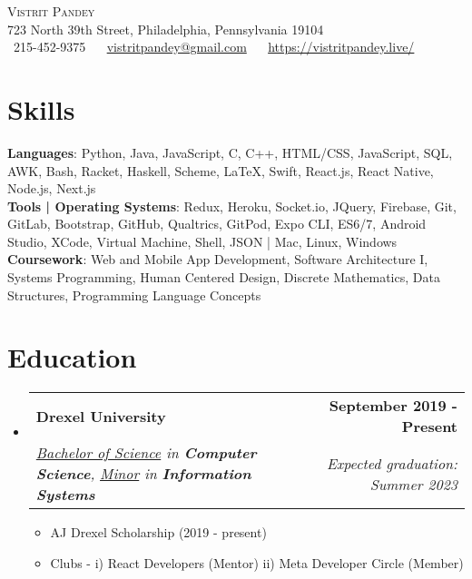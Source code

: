 \documentclass[letterpaper,7pt]{article}
\makeatletter
\newcommand{\resumeItem}[1]{
  \item\small{
    {#1 \vspace{-2pt}}
  }
}
\newcommand{\resumeSubheading}[4]{
  \vspace{-2pt}\item
    \begin{tabular*}{1.0\textwidth}[t]{l@{\extracolsep{\fill}}r}
      \textbf{#1} & \textbf{\small #2} \\
      \textit{\small#3} & \textit{\small #4} \\
    \end{tabular*}\vspace{-7pt}
}
\newcommand{\resumeSubHeadingListStart}{\begin{itemize}[leftmargin=0.0in, label={}]}
\newcommand{\resumeSubHeadingListEnd}{\end{itemize}}
\newcommand{\resumeItemListStart}{\begin{itemize}}
\newcommand{\resumeItemListEnd}{\end{itemize}\vspace{-5pt}}
\makeatother
\begin{document}


\begin{center}

    \vspace{-30pt}
    {\Huge \scshape Vistrit Pandey} \\ \vspace{1pt}
    723 North 39th Street, Philadelphia, Pennsylvania 19104 \\ \vspace{1pt}
    \small \raisebox{-0.1\height}\faPhone\ 215-452-9375 ~ {\raisebox{-0.2\height}\faEnvelope\  \underline{vistritpandey@gmail.com}} ~ {\raisebox{-0.2\height}\Mundus\  \underline{https://vistritpandey.live/}}
    \vspace{5pt}
    
\end{center}

\section{Skills}
 \begin{itemize}[leftmargin=0.15in, label={}]
    \small{\item{
     \textbf{Languages}{: Python, Java, JavaScript, C, C++, HTML/CSS, JavaScript, SQL, AWK, Bash, Racket, Haskell, Scheme, LaTeX, Swift, React.js, React Native, Node.js, Next.js } \\
     \textbf{Tools | Operating Systems}{: Redux, Heroku, Socket.io, JQuery, Firebase, Git, GitLab, Bootstrap, GitHub, Qualtrics, GitPod, Expo CLI, ES6/7, Android Studio, XCode, Virtual Machine, Shell, JSON | Mac, Linux, Windows } \\
     \textbf{Coursework}{: Web and Mobile App Development, Software Architecture I, Systems Programming, Human Centered Design, Discrete Mathematics, Data Structures, Programming Language Concepts}\\
    }}
 \end{itemize}
 \vspace{-16pt}
 
\section{Education}
  \resumeSubHeadingListStart
    \resumeSubheading
      {Drexel University}{September 2019 - Present}
      {\underline{Bachelor of Science} in \textbf{Computer Science}, \underline{Minor} in \textbf{Information Systems}}{Expected graduation: Summer 2023}
      \resumeItemListStart
        \vspace{2pt}
        \resumeItem{AJ Drexel Scholarship (2019 - present)}
        \resumeItem{Clubs - i) React Developers (Mentor) ii) Meta Developer Circle (Member)}
       \resumeItemListEnd  
  \resumeSubHeadingListEnd
\end{document}
